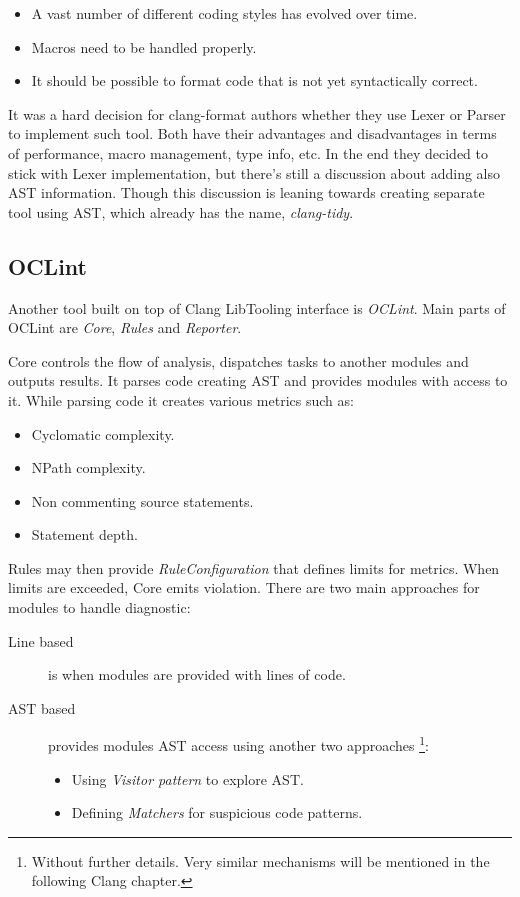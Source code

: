 \begin{itemize}
\item A vast number of different coding styles has evolved over time.
\item Macros need to be handled properly.
\item It should be possible to format code that is not yet syntactically correct.
\end{itemize}

It was a hard decision for clang-format authors whether they use Lexer or Parser to implement such tool. Both have their advantages and disadvantages in terms of performance, macro management, type info, etc. In the end they decided to stick with Lexer implementation, but there's still a discussion about adding also AST information. Though this discussion is leaning towards creating separate tool using AST, which already has the name, \emph{clang-tidy}.

\subsection{OCLint}
Another tool built on top of Clang LibTooling interface is \emph{OCLint}. Main parts of OCLint are \emph{Core}, \emph{Rules} and \emph{Reporter}.

Core controls the flow of analysis, dispatches tasks to another modules and outputs results. It parses code creating AST and provides modules with access to it. While parsing code it creates various metrics such as:

\begin{itemize}
\item Cyclomatic complexity.
\item NPath complexity.
\item Non commenting source statements.
\item Statement depth.
\end{itemize}

Rules may then provide \emph{RuleConfiguration} that defines limits for metrics. When limits  are exceeded, Core emits violation. There are two main approaches for modules to handle diagnostic:

\begin{description}
\item[Line based] is when modules are provided with lines of code.
\item[AST based] provides modules AST access using another two approaches  \footnote{Without further details. Very similar mechanisms will be mentioned in the following Clang chapter.}:
	\begin{itemize}
	\item Using \emph{Visitor pattern} to explore AST.
	\item Defining \emph{Matchers} for suspicious code patterns.
	\end{itemize}
\end{description}

